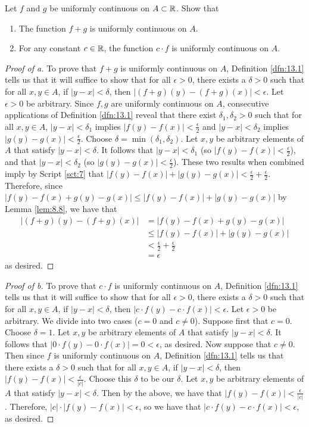 \documentclass[../main.tex]{subfiles}
\begin{document}
\begin{exercise}\label{exr:13.5}
    Let $f$ and $g$ be uniformly continuous on $A\subset\mathbb{R}$. Show that
    \begin{enumerate}[label={(\alph*)}]
        \item The function $f+g$ is uniformly continuous on $A$.
        \item For any constant $c\in\mathbb{R}$, the function $c\cdot f$ is uniformly continuous on $A$.
    \end{enumerate}
    \begin{proof}[Proof of a]
        To prove that $f+g$ is uniformly continuous on $A$, Definition \ref{dfn:13.1} tells us that it will suffice to show that for all $\epsilon>0$, there exists a $\delta>0$ such that for all $x,y\in A$, if $|y-x|<\delta$, then $|(f+g)(y)-(f+g)(x)|<\epsilon$. Let $\epsilon>0$ be arbitrary. Since $f,g$ are uniformly continuous on $A$, consecutive applications of Definition \ref{dfn:13.1} reveal that there exist $\delta_1,\delta_2>0$ such that for all $x,y\in A$, $|y-x|<\delta_1$ implies $|f(y)-f(x)|<\frac{\epsilon}{2}$ and $|y-x|<\delta_2$ implies $|g(y)-g(x)|<\frac{\epsilon}{2}$. Choose $\delta=\min(\delta_1,\delta_2)$. Let $x,y$ be arbitrary elements of $A$ that satisfy $|y-x|<\delta$. It follows that $|y-x|<\delta_1$ (so $|f(y)-f(x)|<\frac{\epsilon}{2}$), and that $|y-x|<\delta_2$ (so $|g(y)-g(x)|<\frac{\epsilon}{2}$). These two results when combined imply by Script \ref{sct:7} that $|f(y)-f(x)|+|g(y)-g(x)|<\frac{\epsilon}{2}+\frac{\epsilon}{2}$. Therefore, since $|f(y)-f(x)+g(y)-g(x)|\leq|f(y)-f(x)|+|g(y)-g(x)|$ by Lemma \ref{lem:8.8}, we have that
        \begin{align*}
            |(f+g)(y)-(f+g)(x)| &= |f(y)-f(x)+g(y)-g(x)|\\
            &\leq |f(y)-f(x)|+|g(y)-g(x)|\\
            &< \frac{\epsilon}{2}+\frac{\epsilon}{2}\\
            &= \epsilon
        \end{align*}
        as desired.
    \end{proof}
    \begin{proof}[Proof of b]
        To prove that $c\cdot f$ is uniformly continuous on $A$, Definition \ref{dfn:13.1} tells us that it will suffice to show that for all $\epsilon>0$, there exists a $\delta>0$ such that for all $x,y\in A$, if $|y-x|<\delta$, then $|c\cdot f(y)-c\cdot f(x)|<\epsilon$. Let $\epsilon>0$ be arbitrary. We divide into two cases ($c=0$ and $c\neq 0$). Suppose first that $c=0$. Choose $\delta=1$. Let $x,y$ be arbitrary elements of $A$ that satisfy $|y-x|<\delta$. It follows that $|0\cdot f(y)-0\cdot f(x)|=0<\epsilon$, as desired. Now suppose that $c\neq 0$. Then since $f$ is uniformly continuous on $A$, Definition \ref{dfn:13.1} tells us that there exists a $\delta>0$ such that for all $x,y\in A$, if $|y-x|<\delta$, then $|f(y)-f(x)|<\frac{\epsilon}{|c|}$. Choose this $\delta$ to be our $\delta$. Let $x,y$ be arbitrary elements of $A$ that satisfy $|y-x|<\delta$. Then by the above, we have that $|f(y)-f(x)|<\frac{\epsilon}{|c|}$. Therefore, $|c|\cdot|f(y)-f(x)|<\epsilon$, so we have that $|c\cdot f(y)-c\cdot f(x)|<\epsilon$, as desired.

\end{proof}
\end{exercise}
\end{document}
